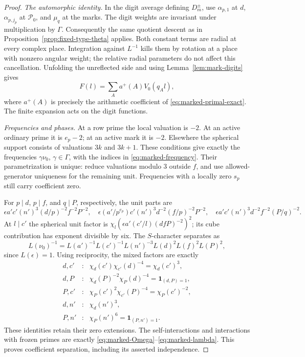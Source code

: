 \documentclass[11pt,a4paper]{article}
\numberwithin{equation}{section}
\theoremstyle{definition}
\theoremstyle{remark}
\newcommand{\ind}{\mathbf 1}
\begin{document}
\begin{proof}
\emph{The automorphic identity.}
In the digit average defining $D_m^\pm$, use $\alpha_{p,1}$ at $d$,
$\alpha_{p,j_p}$ at $\mathcal P_0$, and $\mu_q$ at the marks.
The digit weights are invariant under multiplication by $\Gamma$.
Consequently the same quotient descent as in
Proposition~\ref{prop:fixed-type-theta} applies.  Both constant terms
are radial at every complex place.  Integration against
$L^{-1}$ kills them by rotation at a place with nonzero angular weight;
the relative radial parameters do not affect this cancellation.
Unfolding the unreflected side and using Lemma~\ref{lem:mark-digits}
gives
\[
 F(l)=\sum_A a^+(A)V_0(q_A l),
\]
where $a^+(A)$ is precisely the arithmetic coefficient of
\eqref{eq:marked-primal-exact}.  The finite expansion acts on the digit functions.

\emph{Frequencies and phases.}
At a row prime the local valuation is $-2$.
At an active ordinary prime it is $e_p-2$; at an active mark it is
$-2$.  Elsewhere the spherical support consists of valuations $3k$
and $3k+1$.  These conditions give exactly the frequencies
$\gamma\nu_0$, $\gamma\in\Gamma$, with the indices in
\eqref{eq:marked-frequency}.  Their parametrization is unique:
reduce valuations modulo $3$ outside $f$, and use allowed-generator
uniqueness for the remaining unit.  Frequencies with a locally zero
$s_p$ still carry coefficient zero.

For $p\mid d$, $p\mid f$, and $q\mid P$, respectively, the unit parts are
\[
 \epsilon a'c'(n')^3(d/p)^{-2}f^{-2}P^{-2},\quad
 \epsilon(a'/p^{e_p})c'(n')^3d^{-2}(f/p)^{-2}P^{-2},\quad
 \epsilon a'c'(n')^3d^{-2}f^{-2}(P/q)^{-2}.
\]
At $l\mid c'$ the spherical unit factor is
$\chi_l(\epsilon a'(c'/l)(dfP)^{-2})^2$; its cube contribution has
exponent divisible by six.  The $S$-character separates as
\[
 L(\nu_0)^{-1}=
 L(a')^{-1}L(c')^{-1}L(n')^{-3}L(d)^2L(f)^2L(P)^2,
\]
since $L(\epsilon)=1$.
Using reciprocity, the mixed factors are exactly
\[
\begin{array}{ccl}
 d,c'&:&\chi_d(c')\chi_{c'}(d)^{-4}=\chi_d(c')^3,\\
 d,P&:&\chi_d(P)^{-2}\chi_P(d)^{-4}=\ind_{(d,P)=1},\\
 P,c'&:&\chi_P(c')^{2}\chi_{c'}(P)^{-4}=\chi_P(c')^{-2},\\
 d,n'&:&\chi_d(n')^3,\\
 P,n'&:&\chi_P(n')^6=\ind_{(P,n')=1}.
\end{array}
\]
These identities retain their zero extensions.  The self-interactions
and interactions with frozen primes are exactly
\eqref{eq:marked-Omega}--\eqref{eq:marked-lambda}.
This proves coefficient separation, including its asserted independence.


\end{proof}
\end{document}
